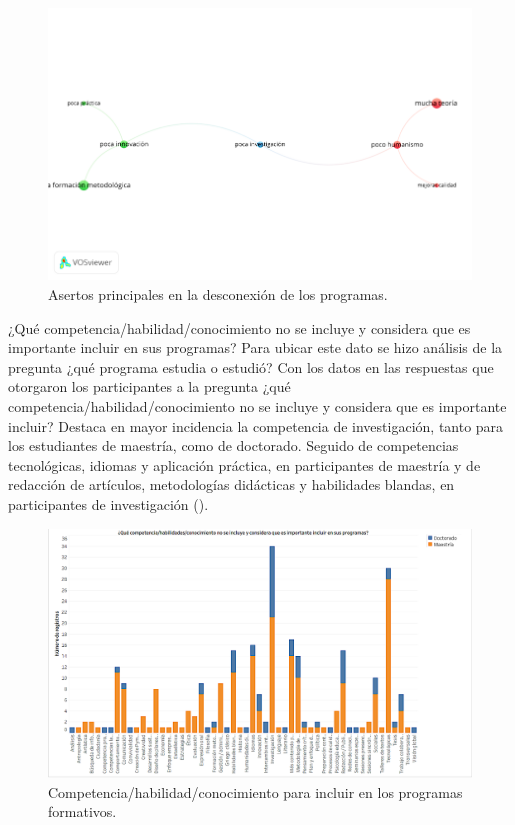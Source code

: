 \documentclass{textolivre}
\begin{document}
\begin{figure}[htbp]
 \hspace*{-1.3in}
 \includegraphics[width=1.22\textwidth]{Fig3.png}
 \caption{Asertos principales en la desconexión  de los programas.}
 \label{fig3}
\end{figure}

¿Qué competencia/habilidad/conocimiento no se incluye y considera que es importante incluir en sus programas? Para ubicar este dato se hizo análisis de la pregunta ¿qué programa estudia o estudió? Con los datos en las respuestas que otorgaron los participantes a la pregunta ¿qué competencia/habilidad/conocimiento no se incluye y considera que es importante incluir? Destaca en mayor incidencia la competencia de investigación, tanto para los estudiantes de maestría, como de doctorado. Seguido de competencias tecnológicas, idiomas y aplicación práctica, en participantes de maestría y de redacción de artículos, metodologías didácticas y habilidades blandas, en participantes de investigación ().

\begin{figure}[htbp]
 \hspace*{-1.3in}
 \includegraphics[width=1.22\textwidth]{Fig4.png}
 \caption{Competencia/habilidad/conocimiento para incluir en los programas formativos.}
 \label{fig4}
\end{figure}
\end{document}
